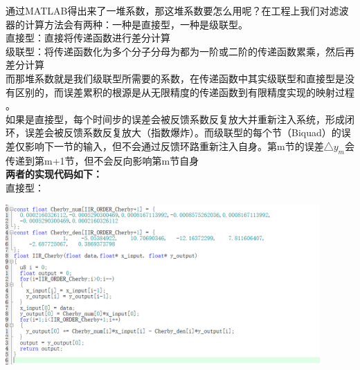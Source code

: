 \documentclass[UTF8,a4paper,12pt]{ctexart}
\begin{document}
        通过MATLAB得出来了一堆系数，那这堆系数要怎么用呢？在工程上我们对滤波器的计算方法会有两种：一种是直接型，一种是级联型。\\
        直接型：直接将传递函数进行差分计算\\
        级联型：将传递函数化为多个分子分母为都为一阶或二阶的传递函数累乘，然后再差分计算\\
        而那堆系数就是我们级联型所需要的系数，在传递函数中其实级联型和直接型是没有区别的，而误差累积的根源是从无限精度的传递函数到有限精度实现的映射过程​。\\
        如果是直接型，每个时间步的误差会被反馈系数 ​反复放大并重新注入系统，形成闭环，误差会被反馈系数反复放大（指数爆炸）。而级联型的每个节（Biquad）的误差仅影响下一节的输入，但不会通过反馈环路重新注入自身。第m节的误差△$ y_{m}$会传递到第m+1节，但不会反向影响第m节自身​\\
       \textbf{两者的实现代码如下：}\\
        直接型：\\
        \par \includegraphics[width=12cm]{picture/chebyshev_direct.png}\\
\end{document}
